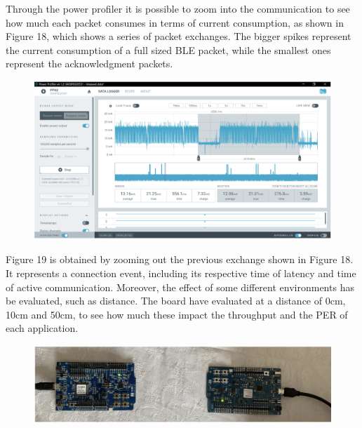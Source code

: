 \documentclass{Configuration_Files/PoliMi3i_thesis}
\begin{document}
Through the power profiler it is possible to zoom into the communication to see how much each packet consumes in terms of current consumption, as shown in Figure 18, which shows a series of packet exchanges. The bigger spikes represent the current consumption of a full sized BLE packet, while the smallest ones represent the acknowledgment packets.

\begin{figure}[H]
    \centering
    \includegraphics[scale=0.3]{Test_Procedure/19.png}
    \label{fig:direct_communication_board_PC}
\end{figure}

Figure 19 is obtained by zooming out the previous exchange shown in Figure 18. It represents a connection event, including its respective time of latency and time of active communication.
Moreover, the effect of some different environments has be evaluated, such as distance. The board have evaluated at a distance of 0cm, 10cm and 50cm, to see how much these impact the throughput and the PER of each application.

\begin{figure}[H]
    \centering
    \includegraphics[scale=0.3]{Test_Procedure/20.png}
    \label{fig:direct_communication_board_PC}
\end{figure}
\end{document}

